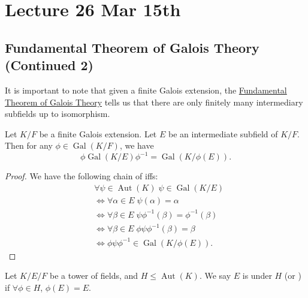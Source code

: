 \documentclass[notoc,notitlepage,nobib]{tufte-book}
\DeclareMathOperator{\Aut}{Aut}
\DeclareMathOperator{\Gal}{Gal}
\begin{document}


\chapter{Lecture 26 Mar 15th}%
\label{chp:lecture_26_mar_15th}

\section{Fundamental Theorem of Galois Theory (Continued 2)}%
\label{sec:fundamental_theorem_of_galois_theory_continued_2}

\begin{note}
  It is important to note that given a finite Galois extension, the
  \hyperref[thm:fundamental_theorem_of_galois_theory]{Fundamental Theorem of
  Galois Theory} tells us that there are only finitely many intermediary
  subfields up to isomorphism.
\end{note}

\begin{propo}\label{propo:other_subfields_through_group_normality}
  Let $K / F$ be a finite Galois extension. Let $E$ be an intermediate subfield
  of $K / F$. Then for any $\phi \in \Gal(K / F)$, we have
  \begin{equation*}
    \phi \Gal(K / E) \phi^{-1} = \Gal(K / \phi(E)).
  \end{equation*}
\end{propo}

\begin{proof}
  We have the following chain of iffs:
  \begin{align*}
    & \forall \psi \in \Aut(K) \; \psi \in \Gal(K / E) \\
    &\iff \forall \alpha \in E \; \psi(\alpha) = \alpha \\
    &\iff \forall \beta \in E \; \psi \phi^{-1} (\beta) = \phi^{-1} (\beta) \\
    &\iff \forall \beta \in E \; \phi \psi \phi^{-1} (\beta) = \beta \\
    &\iff \phi \psi \phi^{-1} \in \Gal(K / \phi(E)).
  \end{align*}
\end{proof}

\begin{defn}[$H$-invariant]\label{defn:_h_invariant}
  Let $K / E / F$ be a tower of fields, and $H \leq \Aut(K)$. We say $E$ is
   under $H$ (or ) if $\forall \phi
  \in H$, $\phi(E) = E$.
\end{defn}
\end{document}
